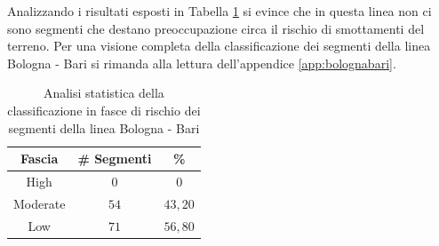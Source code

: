 \newline
Analizzando i risultati esposti in Tabella \ref{percentualebolognabari} si evince che in questa linea non ci sono segmenti che destano preoccupazione circa il rischio di smottamenti del terreno. 
Per una visione completa della classificazione dei segmenti della linea Bologna - Bari si rimanda alla lettura dell'appendice \ref{app:bolognabari}.
\begin{table}[h]
\centering
\begin{tabular}{|c|c|c|}
\hline \rowcolor{lightgray}
Fascia   & \# Segmenti & \%    \\ \hline \rowcolor{flamingopink}
High     & $0$           & $0$     \\ \hline \rowcolor{icterine}
Moderate & $54$          & $43,20$ \\ \hline \rowcolor{inchworm}
Low      & $71$          & $56,80$ \\ \hline
\end{tabular}
\caption{Analisi statistica della classificazione in fasce di rischio dei segmenti della linea Bologna - Bari}
\label{percentualebolognabari}
\end{table}

\newpage
